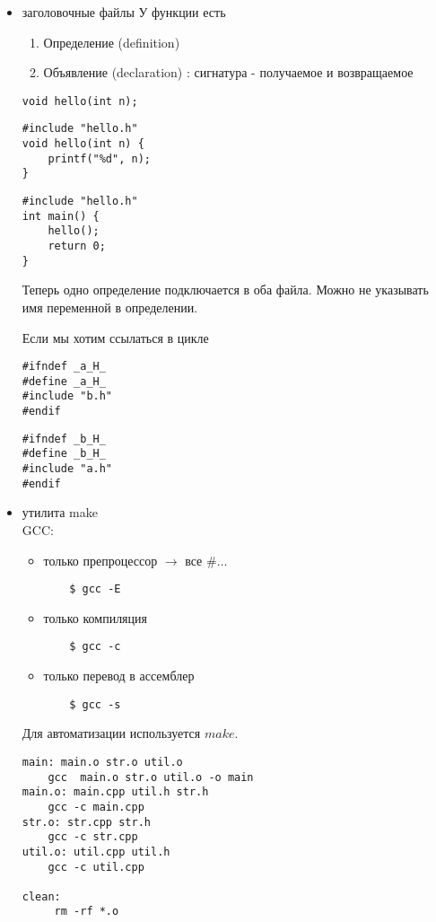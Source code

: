 \begin{itemize}
    \item заголовочные файлы
У функции есть
\begin{enumerate}
    \item  Определение (definition)
    \item  Объявление (declaration) : сигнатура - получаемое и возвращаемое
\end{enumerate}

\begin{lstlisting}[label=some-code,caption={hello.h}]
void hello(int n);
\end{lstlisting}
\begin{lstlisting}[label=some-code,caption={hello.c}]
#include "hello.h"
void hello(int n) {
    printf("%d", n);
}
\end{lstlisting}
\begin{lstlisting}[label=some-code,caption={main.c}]
#include "hello.h"
int main() {
    hello();
    return 0;
}
\end{lstlisting}
Теперь одно определение подключается в оба файла. Можно не указывать имя переменной в определении.

Если  мы хотим ссылаться в цикле
\begin{lstlisting}[label=some-code,caption={a.h}]
#ifndef _a_H_
#define _a_H_
#include "b.h"
#endif
\end{lstlisting}
\begin{lstlisting}[label=some-code,caption={b.h}]
#ifndef _b_H_
#define _b_H_
#include "a.h"
#endif 
\end{lstlisting}
    \item утилита make\\
	GCC:
	\begin{itemize}
	    \item  только препроцессор $\to$ все $ \#\ldots $
	\begin{verbatim}
	$ gcc -E
	\end{verbatim}
    \item  только компиляция
	\begin{verbatim}
	$ gcc -c
	\end{verbatim}
    \item только перевод в ассемблер
	\begin{verbatim}
	$ gcc -s
	\end{verbatim}
	\end{itemize}
	Для автоматизации используется $ make$.
	 \begin{lstlisting}[label=some-code,caption={Makefile}]
main: main.o str.o util.o
    gcc  main.o str.o util.o -o main
main.o: main.cpp util.h str.h
    gcc -c main.cpp
str.o: str.cpp str.h
    gcc -c str.cpp
util.o: util.cpp util.h
    gcc -c util.cpp

clean:
     rm -rf *.o
	\end{lstlisting}
\end{itemize}

% 
